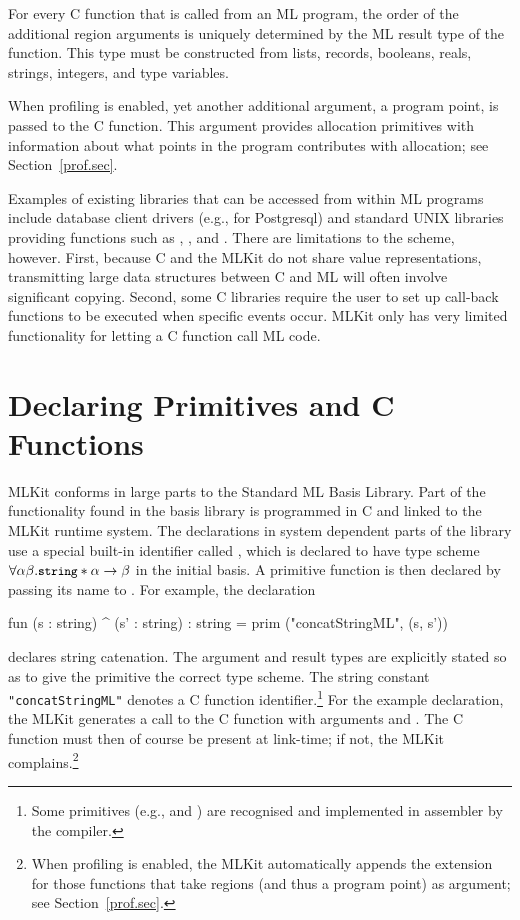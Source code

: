 \documentclass[12pt]{book}
\begin{document}
For every C function that is called from an ML program, the order of the
additional region arguments is uniquely determined by the ML result type of the
function.  This type must be constructed from lists, records, booleans, reals,
strings, integers, and type variables.

When profiling is enabled, yet another additional argument, a program point, is
passed to the C function. This argument provides allocation primitives with
information about what points in the program contributes with allocation; see
Section~\ref{prof.sec}.

Examples of existing libraries that can be accessed from within ML programs
include database client drivers (e.g., for Postgresql) and standard UNIX
libraries providing functions such as , , and . There
are limitations to the scheme, however. First, because C and the MLKit do not
share value representations, transmitting large data structures between C and ML
will often involve significant copying. Second, some C libraries require the
user to set up
%
%
%
call-back functions to be executed when specific events occur. MLKit only
has very limited functionality for letting a C function call ML code.

\section{Declaring Primitives and C Functions}
\label{parPassing.sec}
MLKit conforms in large parts to the Standard ML Basis Library. Part
of the functionality found in the basis library is programmed in C and
linked to the MLKit runtime system.  The declarations in system
dependent parts of the library use a special built-in identifier
called
%
%
%
, which is declared to have type scheme $\forall \alpha \beta .
\mbox{\small\ttfamily string} \ast \alpha \rightarrow \beta$ in the initial basis.  A primitive
function is then declared by passing its name to .  For example, the
declaration
\begin{smlcode}
  fun (s : string) ^ (s' : string) : string =
    prim ("concatStringML", (s, s'))
\end{smlcode}
declares string catenation.  The argument and result types are explicitly stated
so as to give the primitive the correct type scheme.  The string constant
\lstinline{"concatStringML"} denotes a C function identifier.\footnote{Some
primitives (e.g.,  and ) are recognised and
implemented in assembler by the compiler.} For the example declaration, the
MLKit generates a call to the C function  with arguments
 and . The C function must then of course be present at link-time;
if not, the MLKit complains.\footnote{When profiling is enabled, the MLKit
automatically appends the extension  for those functions that take
regions (and thus a program point) as argument; see Section~\ref{prof.sec}.}
\end{document}
